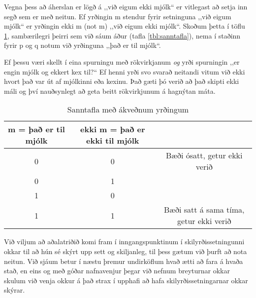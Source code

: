 \vspace{5pt}

Vegna þess að áherslan er lögð á ,,við eigum ekki mjólk“ er vitlegast að setja inn segð sem er með neitun.
Ef yrðingin m stendur fyrir setninguna ,,við eigum mjólk“ er yrðingin ekki m (not m) ,,við eigum ekki mjólk“.
Skoðum þetta í töflu \ref{tbl:sanntafla-kaffi}, sambærilegri þeirri sem við sáum áður (tafla \ref{tbl:sanntafla}), nema í staðinn fyrir p og q notum við yrðinguna ,,það er til mjólk“.

Ef þessu væri skellt í eina spurningu með rökvirkjanum \emph{og} yrði spurningin ,,er engin mjólk og ekkert kex til?“
Ef henni yrði svo svarað neitandi vitum við ekki hvort það var út af mjólkinni eða kexinu.
Það gæti þó verið að það skipti ekki máli og því nauðsynlegt að geta beitt rökvirkjunum á hagnýtan máta.

\begin{center}
	\centering
	\begin{table}[H]
		\centering
		\caption{Sanntafla með ákveðnum yrðingum}
		\vspace{3pt}
		\label{tbl:sanntafla-kaffi}
		\begin{tabular}{|c | c| c |}
			m = það er til mjólk & ekki m = það er ekki til mjólk\\ 
			\hline  
			0 & 0 & Bæði ósatt, getur ekki verið\\
			0 & 1 &\\
			1 & 0 &\\
			1 & 1 & Bæði satt á sama tíma, getur ekki verið\\
			\hline
		\end{tabular}
		
	\end{table}
\end{center}
Við viljum að aðalatriðið komi fram í inngangspunktinum í skilyrðissetningunni okkar til að hún sé skýrt upp sett og skiljanleg, til þess gætum við þurft að nota neitun.
Við sjáum betur í næstu þremur undirköflum hvað ætti að fara á hvaða stað, en eins og með góðar nafnavenjur þegar við nefnum breyturnar okkar skulum við venja okkur á það strax í upphafi að hafa skilyrðissetningarnar okkar skýrar.

